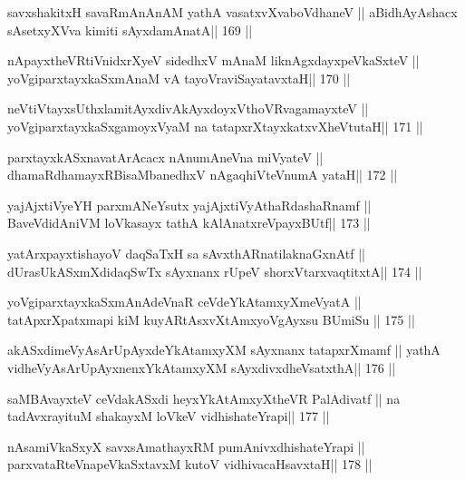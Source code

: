 \begin{shl}
savxshakitxH savaRmAnAnAM yathA vasatxvXvaboVdhaneV ||
aBidhAyAshacx sA\s setxyXVva kimiti sAyxdamAnatA\hfill || 169 ||
\end{shl}

\begin{shl}
nApayxtheVR\s tiVnidxrXyeV sidedhxV mAnaM liknAgxdayxpeVkaSxteV ||
yoVgiparxtayxkaSxmAnaM vA tayoVraviSayatavxtaH\hfill || 170 ||
\end{shl}

\begin{shl}
neVtiVtayxsUthxlamitAyxdivAkAyxdoyxV\s thoVR\s vagamayxteV ||
yoVgiparxtayxkaSxgamoyxV\s yaM na tatapxrXtayxkatxvXheVtutaH\hfill || 171 ||
\end{shl}

\begin{shl}
parxtayxkASxnavatArAcacx nAnumAneVna miVyateV ||
dhamaRdhamayxRBisaMbanedhxV nAgaqhiVteV\s numA yataH\hfill || 172 ||
\end{shl}

\begin{shl}
yajAjxtiVyeYH parxmANeYsutx yajAjxtiVyAthaRdashaRnamf ||
BaveVdidAniVM loVkasayx tathA kAlAnatxreV\s payxBUtf\hfill || 173 ||
\end{shl}

\begin{shl}
yatArxpayxtishayoV daqSaTxH sa sAvxthARnatilaknaGxnAtf ||
dUrasUkASxmXdidaqSwTx sAyxnanx rUpeV shorxVtarxvaqtitxtA\hfill || 174 ||
\end{shl}

\begin{shl}
yoVgiparxtayxkaSxmAnAdeVnaR ceVdeYkAtamxyXmeVyatA ||
tatApxrXpatxmapi kiM kuyARtAsxvXtAmx\s yoVgAyxsu BUmiSu \hfill || 175 ||
\end{shl}

\begin{shl}
akASxdimeVyAsArUpAyxdeYkAtamxyXM sAyxnanx tatapxrXmamf ||
yathA vidheVyAsArUpAyxnenxYkAtamxyXM sAyxdivxdheVsatxthA\hfill || 176 ||
\end{shl}

\begin{shl}
saMBAvayxteV ceVdakASxdi heyxYkAtAmxyXtheVR PalAdivatf ||
na tadAvxrayituM shakayxM loVkeV vidhishateYrapi\hfill || 177 ||
\end{shl}

\begin{shl}
nAsamiVkaSxyX savxsAmathayxRM pumAnivxdhishateYrapi ||
parxvataRteV\s napeVkaSxtavxM kutoV vidhivacaHsavxtaH\hfill || 178 ||
\end{shl}

